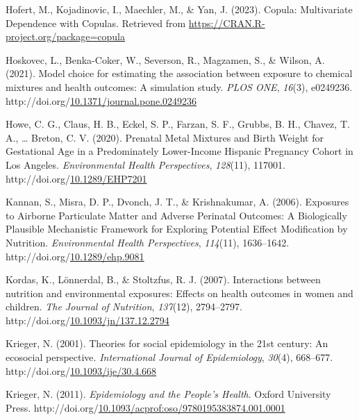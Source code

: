 \documentclass[12pt, twoside]{amherstthesis}
\newenvironment{CSLReferences}[2]%
  {}%
  {\par}
\begin{document}
\begin{CSLReferences}{1}{0}
\leavevmode{}%
Hofert, M., Kojadinovic, I., Maechler, M., \& Yan, J. (2023). Copula: {Multivariate} {Dependence} with {Copulas}. Retrieved from \url{https://CRAN.R-project.org/package=copula}

\leavevmode{}%
Hoskovec, L., Benka-Coker, W., Severson, R., Magzamen, S., \& Wilson, A. (2021). Model choice for estimating the association between exposure to chemical mixtures and health outcomes: {A} simulation study. \emph{PLOS ONE}, \emph{16}(3), e0249236. http://doi.org/\href{https://doi.org/10.1371/journal.pone.0249236}{10.1371/journal.pone.0249236}

\leavevmode{}%
Howe, C. G., Claus, H. B., Eckel, S. P., Farzan, S. F., Grubbs, B. H., Chavez, T. A., \ldots{} Breton, C. V. (2020). Prenatal {Metal} {Mixtures} and {Birth} {Weight} for {Gestational} {Age} in a {Predominately} {Lower}-{Income} {Hispanic} {Pregnancy} {Cohort} in {Los} {Angeles}. \emph{Environmental Health Perspectives}, \emph{128}(11), 117001. http://doi.org/\href{https://doi.org/10.1289/EHP7201}{10.1289/EHP7201}

\leavevmode{}%
Kannan, S., Misra, D. P., Dvonch, J. T., \& Krishnakumar, A. (2006). Exposures to {Airborne} {Particulate} {Matter} and {Adverse} {Perinatal} {Outcomes}: {A} {Biologically} {Plausible} {Mechanistic} {Framework} for {Exploring} {Potential} {Effect} {Modification} by {Nutrition}. \emph{Environmental Health Perspectives}, \emph{114}(11), 1636--1642. http://doi.org/\href{https://doi.org/10.1289/ehp.9081}{10.1289/ehp.9081}

\leavevmode{}%
Kordas, K., Lönnerdal, B., \& Stoltzfus, R. J. (2007). Interactions between nutrition and environmental exposures: Effects on health outcomes in women and children. \emph{The Journal of Nutrition}, \emph{137}(12), 2794--2797. http://doi.org/\href{https://doi.org/10.1093/jn/137.12.2794}{10.1093/jn/137.12.2794}

\leavevmode{}%
Krieger, N. (2001). Theories for social epidemiology in the 21st century: An ecosocial perspective. \emph{International Journal of Epidemiology}, \emph{30}(4), 668--677. http://doi.org/\href{https://doi.org/10.1093/ije/30.4.668}{10.1093/ije/30.4.668}

\leavevmode{}%
Krieger, N. (2011). \emph{Epidemiology and the {People}'s {Health}}. Oxford University Press. http://doi.org/\href{https://doi.org/10.1093/acprof:oso/9780195383874.001.0001}{10.1093/acprof:oso/9780195383874.001.0001}


\end{CSLReferences}
\end{document}
